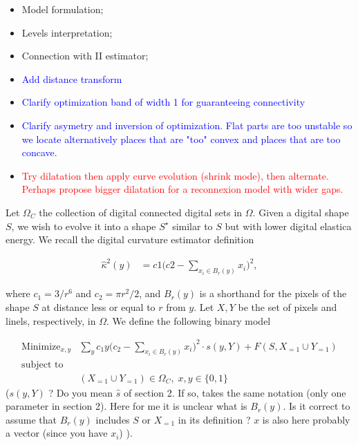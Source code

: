 \documentclass[runningheads]{llncs}
\newcommand{\todo}[1]{{\textcolor{blue}{#1}}}
\newcommand{\test}[1]{{\textcolor{red}{#1}}}
\newcommand{\jaco}[1]{{\textcolor{green!50!black}{#1}}}
\begin{document}
\begin{itemize}
	\item{Model formulation;}
	\item{Levels interpretation;}
    \item{Connection with II estimator;}	
    \item{\todo{Add distance transform}}
    \item{\todo{Clarify optimization band of width 1 for guaranteeing connectivity}}
    \item{\todo{Clarify asymetry and inversion of optimization. Flat parts are too unstable so we locate alternatively places that are "too" convex and places that are too concave.}}
    \item{\test{Try dilatation then apply curve evolution (shrink mode), then alternate. Perhaps propose bigger dilatation for a reconnexion model with wider gaps.}}
\end{itemize}

\hrulefill

	Let $\Omega_C$ the collection of digital connected digital sets in $\Omega$. Given a digital shape $S$, we wish to evolve it into a shape $S^\star$ similar to $S$ but with lower digital elastica energy. We recall the digital curvature estimator definition
	
\begin{align}
	\hat{\kappa}^2(y) &= c1\Big( c2 - \sum_{x_i \in B_r(y)}{x_i} \Big)^2, 
	\label{eq:curvature-estimator-pixels}
\end{align}

where $c_1=3/r^6$ and $c_2=\pi r^2/2$, \jaco{and $B_r(y)$ is a shorthand for the pixels of the shape $S$ at distance less or equal to $r$ from $y$}. Let $X,Y$ be the set of pixels and linels, respectively, in $\Omega$. We define the following binary model
		
\begin{align}
\text{Minimize}_{x,y} & \sum_{y}{c_1y \Big(c_2 - \sum_{x_i \in B_r(y)}{x_i}\Big)^2	 } \cdot s(y,Y) \nonumber + F(S,X_{=1} \cup Y_{=1}) \nonumber \\
\text{subject to} & \nonumber \\
& (X_{=1} \cup Y_{=1}) \in \Omega_C, \; x,y \in \{0,1\}
\label{eq:general-binary-formulation}
\end{align}
\jaco{($s(y,Y)$ ? Do you mean $\hat{s}$ of section 2. If so, takes the same notation (only one parameter in section 2). Here for me it is unclear what is $B_r(y)$. Is it correct to assume that $B_r(y)$  includes $S$ or $X_{=1}$ in its definition ? $x$ is also here probably a vector (since you have $x_i$) ).}
\end{document}

